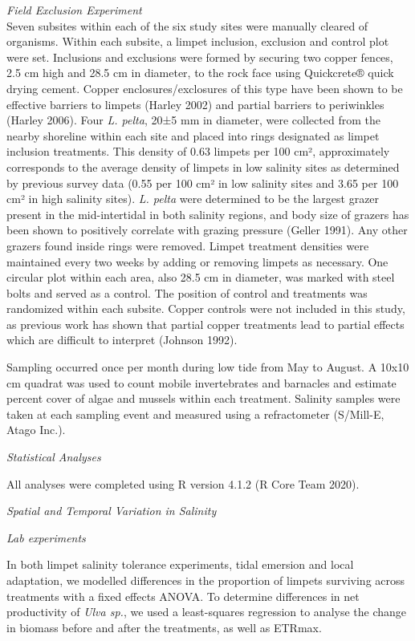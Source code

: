 \documentclass[
  11pt,
]{article}
\begin{document}
\emph{Field Exclusion Experiment}\\
Seven subsites within each of the six study sites were manually cleared of organisms. Within each subsite, a limpet inclusion, exclusion and control plot were set. Inclusions and exclusions were formed by securing two copper fences, 2.5 cm high and 28.5 cm in diameter, to the rock face using Quickcrete® quick drying cement. Copper enclosures/exclosures of this type have been shown to be effective barriers to limpets (Harley 2002) and partial barriers to periwinkles (Harley 2006). Four \emph{L. pelta}, 20±5 mm in diameter, were collected from the nearby shoreline within each site and placed into rings designated as limpet inclusion treatments. This density of 0.63 limpets per 100 cm², approximately corresponds to the average density of limpets in low salinity sites as determined by previous survey data (0.55 per 100 cm² in low salinity sites and 3.65 per 100 cm² in high salinity sites). \emph{L. pelta} were determined to be the largest grazer present in the mid-intertidal in both salinity regions, and body size of grazers has been shown to positively correlate with grazing pressure (Geller 1991). Any other grazers found inside rings were removed. Limpet treatment densities were maintained every two weeks by adding or removing limpets as necessary. One circular plot within each area, also 28.5 cm in diameter, was marked with steel bolts and served as a control. The position of control and treatments was randomized within each subsite. Copper controls were not included in this study, as previous work has shown that partial copper treatments lead to partial effects which are difficult to interpret (Johnson 1992).

Sampling occurred once per month during low tide from May to August. A 10x10 cm quadrat was used to count mobile invertebrates and barnacles and estimate percent cover of algae and mussels within each treatment. Salinity samples were taken at each sampling event and measured using a refractometer (S/Mill-E, Atago Inc.).

\emph{Statistical Analyses}

All analyses were completed using R version 4.1.2 (R Core Team 2020).

\emph{Spatial and Temporal Variation in Salinity}

\emph{Lab experiments}

In both limpet salinity tolerance experiments, tidal emersion and local adaptation, we modelled differences in the proportion of limpets surviving across treatments with a fixed effects ANOVA. To determine differences in net productivity of \emph{Ulva sp.}, we used a least-squares regression to analyse the change in biomass before and after the treatments, as well as ETRmax.
\end{document}
